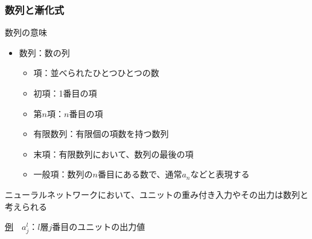 \documentclass[dvipdfmx,aspectratio=169]{beamer}
\begin{document}
	\subsubsection{数列と漸化式}
	\begin{frame}{数列の意味}
		\begin{itemize}
			\item \alert{数列}：数の列
			\begin{itemize}
				\item \alert{項}：並べられたひとつひとつの数
				\item \alert{初項}：1番目の項
				\item \alert{第$ n $項}：$ n $番目の項
				\item \alert{有限数列}：有限個の項数を持つ数列
				\item \alert{末項}：有限数列において、数列の最後の項
				\item \alert{一般項}：数列の$ n $番目にある数で、通常$ a_n $などと表現する
			\end{itemize}
		\end{itemize}
		ニューラルネットワークにおいて、ユニットの重み付き入力やその出力は数列と考えられる
		
		\underline{例}　$ a^l_j $：$ l $層$ j $番目のユニットの出力値
	\end{frame}
\end{document}
